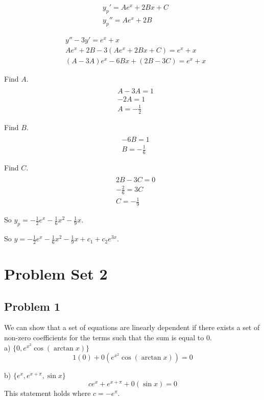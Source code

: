 \documentclass[titlepage]{article}
\begin{document}
\begin{align*}
  &y_p' = Ae^x + 2Bx + C
  \\ &y_p'' = Ae^x + 2B
\end{align*}

\begin{align*}
  &y'' - 3y' = e^x + x
  \\ &Ae^x + 2B - 3(Ae^x + 2Bx + C) = e^x + x
  \\ &(A- 3A)e^x - 6Bx + (2B - 3C) = e^x + x
\end{align*}

\noindent Find $A$.
\begin{align*}
  \\ &A - 3A = 1
  \\ &-2A = 1
  \\ &A = -\frac{1}{2}
\end{align*}

\noindent Find $B$.
\begin{align*}
  \\ &-6B = 1
  \\ &B = -\frac{1}{6}
\end{align*}

\noindent Find $C$.
\begin{align*}
  \\ &2B - 3C = 0
  \\ &-\frac{2}{6} = 3C
  \\ &C = -\frac{1}{9}
\end{align*}

\noindent So $y_p = -\frac{1}{2}e^x -\frac{1}{6}x^2 - \frac{1}{9}x$.

\noindent So $y = -\frac{1}{2}e^x -\frac{1}{6}x^2 - \frac{1}{9}x + c_1 + c_2e^{3x}$.

\section{Problem Set 2}
\subsection{Problem 1}

We can show that a set of equations are linearly dependent if there exists a set of non-zero coefficients for the terms such that the sum is equal to 0.\\

\noindent a) $\{0, e^{x^2} \cos(\arctan x)\}$
$$1(0) + 0(e^{x^2} \cos(\arctan x)) = 0$$

\noindent b) $\{e^x, e^{x+\pi}, \sin x\}$
$$ce^x + e^{x + \pi} + 0(\sin x) = 0$$
This statement holds where $c = -e^{\pi}.$\\
\end{document}
